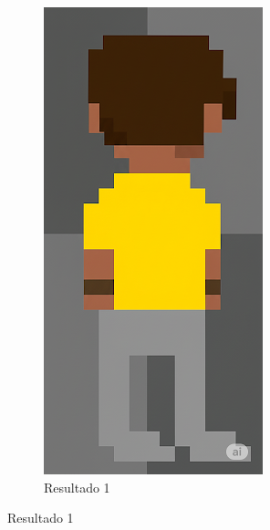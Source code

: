 \begin{figure}[htbp]
\begin{subfigure}{0.3\linewidth}
        \includegraphics[width=1\linewidth]{figs/geminiPro/chat11/2res1.png}
        \caption{\small Resultado 1}

\end{subfigure}
\end{figure}
